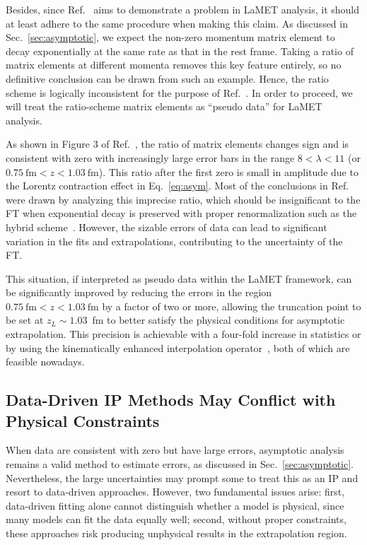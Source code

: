 \documentclass[prd,twocolumn,superscriptaddress,preprintnumbers,showpacs,nofootinbib,notitlepage,floatfix]{revtex4-2}
\DeclareRobustCommand{\eq}[1]{Eq.~\eqref{eq:#1}}
\DeclareRobustCommand{\sec}[1]{Sec.~\ref{sec:#1}}
\DeclareRobustCommand{\eq}[1]{Eq.~(\ref{eq:#1})}
\begin{document}
Besides, since Ref.~\cite{Dutrieux:2025jed} aims to demonstrate a problem in LaMET analysis, it should at least adhere to the same procedure when making this claim. As discussed in \sec{asymptotic}, we expect the non-zero momentum matrix element to decay exponentially at the same rate as that in the rest frame. Taking a ratio of matrix elements at different momenta removes this key feature entirely, so no definitive conclusion can be drawn from such an example. Hence, the ratio scheme is logically inconsistent for the purpose of Ref.~\cite{Dutrieux:2025jed}. In order to proceed, we will treat the ratio-scheme matrix elements as ``pseudo data'' for LaMET analysis.

As shown in Figure 3 of Ref.~\cite{Dutrieux:2025jed}, the ratio of matrix elements changes sign and is consistent with zero with increasingly large error bars in the range $8<\lambda<11$ (or $0.75~\text{fm}<z<1.03~\text{fm}$). 
This ratio after the first zero is small in amplitude due to the Lorentz contraction effect in \eq{asym}. Most of the conclusions in Ref.~\cite{Dutrieux:2025jed} were drawn by analyzing this imprecise ratio, which should be insignificant to the FT when exponential decay is preserved with proper renormalization such as the hybrid scheme~\cite{Ji:2020brr,Holligan:2023rex,Zhang:2023bxs}. However, the sizable errors of data can lead to significant variation in the fits and extrapolations, contributing to the uncertainty of the FT.

This situation, if interpreted as pseudo data within the LaMET framework, can be significantly improved by reducing the errors in the region $0.75~\text{fm} < z <1.03~\text{fm}$ by a factor of two or more, allowing the truncation point to be set at $z_L \sim 1.03$~fm to better satisfy the physical conditions for asymptotic extrapolation. This precision is achievable with a four-fold increase in statistics or by using the kinematically enhanced interpolation operator~\cite{Zhang:2025hyo}, both of which are feasible nowadays.

\subsection{Data-Driven IP Methods May Conflict with Physical Constraints}
\label{sec:dd}

When data are consistent with zero but have large errors, asymptotic analysis remains a valid method to estimate errors, as discussed in \sec{asymptotic}. Nevertheless, the large uncertainties may prompt some to treat this as an IP and resort to data-driven approaches. However, two fundamental issues arise: first, data-driven fitting alone cannot distinguish whether a model is physical, since many models can fit the data equally well; second, without proper constraints, these approaches risk producing unphysical results in the extrapolation region.
\end{document}
